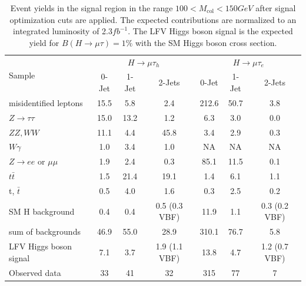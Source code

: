 \documentclass[oneside, letterpaper, oldfontcommands]{memoir}
\begin{document}
 \begin{table}[hbtp]
 \centering  \caption{Event yields in the signal region in the range $100 < M_\text{col} < 150GeV$ after signal optimization cuts are applied. The expected contributions are normalized to an integrated luminosity
of 2.3$fb^{-1}$. The LFV Higgs boson signal is the expected yield for $B(H \rightarrow \mu \tau)=1\%$ with the SM Higgs boson cross section.}
  \label{tab:EventYieldTable_100_to_150_13TeV_Signal}
  \begin{tabular}{lccc|ccc} \hline
        \multirow{2}{*}{Sample}                                & \multicolumn{3}{c}{$H \rightarrow \mu \tau_{h}$}                &     \multicolumn{3}{c}{$H \rightarrow \mu \tau_{e}$}     \\ \cline{2-7}
                                              &  0-Jet            & 1-Jet            & 2-Jets               &  0-Jet             & 1-Jet            & 2-Jets  \\ \hline
    misidentified leptons                    &  15.5  &   5.8     &  2.4 & 212.6 & 50.7 & 3.8\\
    $ Z \rightarrow \tau \tau$                    & 15.0   & 13.2      &  1.2 & 6.3   & 3.0  & 0.0  \\
    $ ZZ,WW$                       & 11.1   &  4.4      &  45.8 & 3.4   & 2.9  & 0.3\\
    $ W\gamma$                             &   1.0  &  3.4      &  1.0 &NA & NA & NA    \\
    $ Z \rightarrow ee$ or $\mu \mu$          &  1.9   &  2.4      &  0.3 & 85.1 & 11.5& 0.1  \\
    $t\bar{t}     $                            &  1.5   & 21.4      & 19.1 &1.4 & 6.1 & 1.1    \\
    t, $\bar{t}$                             &  0.5   &  4.0      &  1.6 &0.3 & 2.5 & 0.2    \\
    SM H background                        &  0.4   &  0.4      &  0.5 (0.3 VBF) &11.9 & 1.1 & 0.3 (0.2 VBF)    \\ \hline
    sum of backgrounds                       & 46.9   & 55.0      & 28.9 &310.1& 76.7 & 5.8  \\  \hline
    LFV Higgs boson signal                   &  7.1   &  3.7      &  1.9 (1.1 VBF) &13.8 & 4.7 & 1.2 (0.7 VBF)   \\ \hline \hline
      Observed data                          &  33    &  41       &  32  & 315 & 77 & 7 \\ \hline
  \end{tabular}
\end{table}
\end{document}
